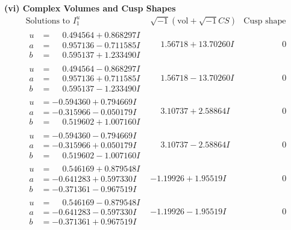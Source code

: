 \documentclass[1p]{elsarticle_modified}
\theoremstyle{definition}
\newcommand{\I}{\sqrt{-1}}
\begin{document}
\newpage\flushleft \textbf{(vi) Complex Volumes and Cusp Shapes}
$$\begin{array}{c|c|c}  
\text{Solutions to }I^u_{1}& \I (\text{vol} + \sqrt{-1}CS) & \text{Cusp shape}\\
 \hline 
\begin{aligned}
u &= \phantom{-}0.494564 + 0.868297 I \\
a &= \phantom{-}0.957136 - 0.711585 I \\
b &= \phantom{-}0.595137 + 1.233490 I\end{aligned}
 & \phantom{-}1.56718 + 13.70260 I & \phantom{-0.000000 } 0 \\ \hline\begin{aligned}
u &= \phantom{-}0.494564 - 0.868297 I \\
a &= \phantom{-}0.957136 + 0.711585 I \\
b &= \phantom{-}0.595137 - 1.233490 I\end{aligned}
 & \phantom{-}1.56718 - 13.70260 I & \phantom{-0.000000 } 0 \\ \hline\begin{aligned}
u &= -0.594360 + 0.794669 I \\
a &= -0.315966 - 0.050179 I \\
b &= \phantom{-}0.519602 + 1.007160 I\end{aligned}
 & \phantom{-}3.10737 + 2.58864 I & \phantom{-0.000000 } 0 \\ \hline\begin{aligned}
u &= -0.594360 - 0.794669 I \\
a &= -0.315966 + 0.050179 I \\
b &= \phantom{-}0.519602 - 1.007160 I\end{aligned}
 & \phantom{-}3.10737 - 2.58864 I & \phantom{-0.000000 } 0 \\ \hline\begin{aligned}
u &= \phantom{-}0.546169 + 0.879548 I \\
a &= -0.641283 + 0.597330 I \\
b &= -0.371361 - 0.967519 I\end{aligned}
 & -1.19926 + 1.95519 I & \phantom{-0.000000 } 0 \\ \hline\begin{aligned}
u &= \phantom{-}0.546169 - 0.879548 I \\
a &= -0.641283 - 0.597330 I \\
b &= -0.371361 + 0.967519 I\end{aligned}
 & -1.19926 - 1.95519 I & \phantom{-0.000000 } 0 \\ \hline\begin{aligned}

\end{aligned}
\end{array}$$
\end{document}
